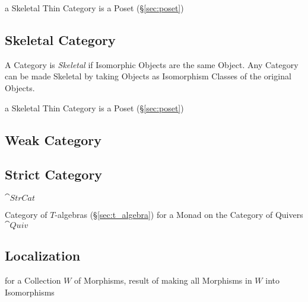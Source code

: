 a Skeletal Thin Category is a Poset (\S\ref{sec:poset})



\subsection{Skeletal Category}\label{sec:skeletal_category}

A Category is \emph{Skeletal} if Isomorphic Objects are the same
Object. Any Category can be made Skeletal by taking Objects as
Isomorphism Classes of the original Objects.

a Skeletal Thin Category is a Poset (\S\ref{sec:poset})



\subsection{Weak Category}\label{sec:weak_category}

\subsection{Strict Category}\label{sec:strict_category}

$\cat{StrCat}$

Category of $T$-algebras (\S\ref{sec:t_algebra}) for a Monad on the
Category of Quivers $\cat{Quiv}$



\subsection{Localization}\label{sec:category_localization}

for a Collection $W$ of Morphisms, result of making all Morphisms in
$W$ into Isomorphisms




